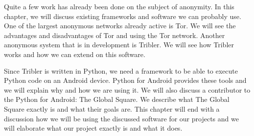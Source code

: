 % 
Quite a few work has already been done on the subject of anonymity. In this chapter, we will discuss existing frameworks and software we can probably use. One of the largest anonymous networks already active is Tor. We will see the advantages and disadvantages of Tor and using the Tor network. Another anonymous system that is in development is Tribler. We will see how Tribler works and how we can extend on this software.
	
Since Tribler is written in Python, we need a framework to be able to execute Python code on an Android device. Python for Android provides these tools and we will explain why and how we are using it. We will also discuss a contributor to the Python for Android: The Global Square. We describe what The Global Square exactly is and what their goals are. This chapter will end with a discussion how we will be using the discussed software for our projects and we will elaborate what our project exactly is and what it does.